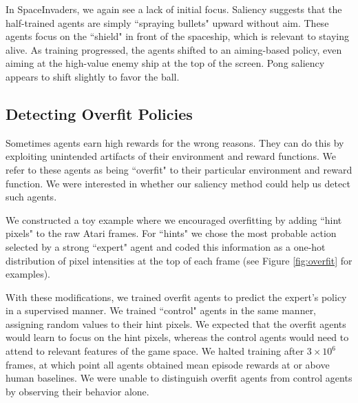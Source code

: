 \documentclass{article}
\begin{document}
In SpaceInvaders, we again see a lack of initial focus. Saliency suggests that the half-trained agents are simply ``spraying bullets" upward without aim. These agents focus on the ``shield" in front of the spaceship, which is relevant to staying alive. As training progressed, the agents shifted to an aiming-based policy, even aiming at the high-value enemy ship at the top of the screen. Pong saliency appears to shift slightly to favor the ball.

\subsection{Detecting Overfit Policies}

Sometimes agents earn high rewards for the wrong reasons. They can do this by exploiting unintended artifacts of their environment and reward functions. We refer to these agents as being ``overfit" to their particular environment and reward function. We were interested in whether our saliency method could help us detect such agents.

We constructed a toy example where we encouraged overfitting by adding ``hint pixels" to the raw Atari frames. For ``hints" we chose the most probable action selected by a strong ``expert" agent and coded this information as a one-hot distribution of pixel intensities at the top of each frame (see Figure \ref{fig:overfit} for examples).

With these modifications, we trained overfit agents to predict the expert's policy in a supervised manner. We trained ``control" agents in the same manner, assigning random values to their hint pixels. We expected that the overfit agents would learn to focus on the hint pixels, whereas the control agents would need to attend to relevant features of the game space. We halted training after $3\times 10^6$ frames, at which point all agents obtained mean episode rewards at or above human baselines. We were unable to distinguish overfit agents from control agents by observing their behavior alone.
\end{document}
